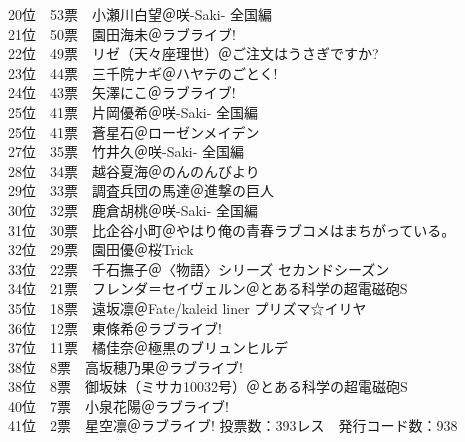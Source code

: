 {    20位　53票　小瀬川白望＠咲-Saki- 全国編                                   \\
    21位　50票　園田海未＠ラブライブ!                                         \\
    22位　49票　リゼ（天々座理世）＠ご注文はうさぎですか?                     \\
    23位　44票　三千院ナギ＠ハヤテのごとく!                                   \\
    24位　43票　矢澤にこ＠ラブライブ!                                         \\
    25位　41票　片岡優希＠咲-Saki- 全国編                                     \\
    25位　41票　蒼星石＠ローゼンメイデン                                      \\
    27位　35票　竹井久＠咲-Saki- 全国編                                       \\
    28位　34票　越谷夏海＠のんのんびより                                      \\
    29位　33票　調査兵団の馬達＠進撃の巨人                                    \\
    30位　32票　鹿倉胡桃＠咲-Saki- 全国編                                     \\
    31位　30票　比企谷小町＠やはり俺の青春ラブコメはまちがっている。          \\
    32位　29票　園田優＠桜Trick                                               \\
    33位　22票　千石撫子＠〈物語〉シリーズ セカンドシーズン                   \\
    34位　21票　フレンダ＝セイヴェルン＠とある科学の超電磁砲S                 \\
    35位　18票　遠坂凛＠Fate/kaleid liner プリズマ☆イリヤ                    \\
    36位　12票　東條希＠ラブライブ!                                           \\
    37位　11票　橘佳奈＠極黒のブリュンヒルデ                                  \\
    38位　8票　高坂穂乃果＠ラブライブ!                                        \\
    38位　8票　御坂妹（ミサカ10032号）＠とある科学の超電磁砲S                 \\
    40位　7票　小泉花陽＠ラブライブ!                                          \\
    41位　2票　星空凛＠ラブライブ! 
}{
    投票数：393レス　発行コード数：938                                        \\
}
